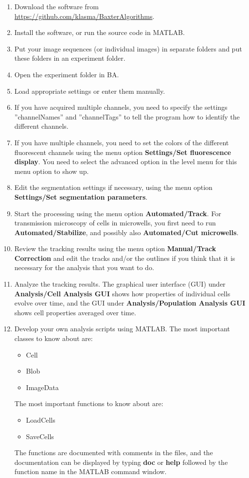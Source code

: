 \documentclass[a4paper, oneside, onecolumn, 11pt]{article}
\newcommand{\menu}[1]{\textbf{#1}}
\newcommand{\setting}[1]{''#1''}
\newcommand{\command}[1]{\textbf{#1}}
\begin{document}
\begin{enumerate}
\item Download the software from\\ \url{https://github.com/klasma/BaxterAlgorithms}.
\item Install the software, or run the source code in MATLAB.
\item Put your image sequences (or individual images) in separate folders and put these folders in an experiment folder.
\item Open the experiment folder in BA.
\item Load appropriate settings or enter them manually.
\item If you have acquired multiple channels, you need to specify the settings \setting{channelNames} and \setting{channelTags} to tell the program how to identify the different channels.
\item If you have multiple channels, you need to set the colors of the different fluorescent channels using the menu option \menu{Settings/\allowbreak Set fluorescence display}. You need to select the advanced option in the level menu for this menu option to show up.
\item Edit the segmentation settings if necessary, using the menu option \menu{Settings/\allowbreak Set segmentation parameters}.
\item Start the processing using the menu option \menu{Automated/\allowbreak Track}. For transmission microscopy of cells in microwells, you first need to run \menu{Automated/\allowbreak Stabilize}, and possibly also \menu{Automated/\allowbreak Cut microwells}.
\item Review the tracking results using the menu option \menu{Manual/\allowbreak Track Correction} and edit the tracks and/or the outlines if you think that it is necessary for the analysis that you want to do.
\item Analyze the tracking results. The graphical user interface (GUI) under \menu{Analysis/\allowbreak Cell Analysis GUI} shows how properties of individual cells evolve over time, and the GUI under \menu{Analysis/\allowbreak Population Analysis GUI} shows cell properties averaged over time.
\item Develop your own analysis scripts using MATLAB. The most important classes to know about are:
\begin{itemize}
\item Cell
\item Blob
\item ImageData
\end{itemize}
The most important functions to know about are:
\begin{itemize}
\item LoadCells
\item SaveCells
\end{itemize}
The functions are documented with comments in the files, and the documentation can be displayed by typing \command{doc} or \command{help} followed by the function name in the MATLAB command window.
\end{enumerate}
\end{document}
